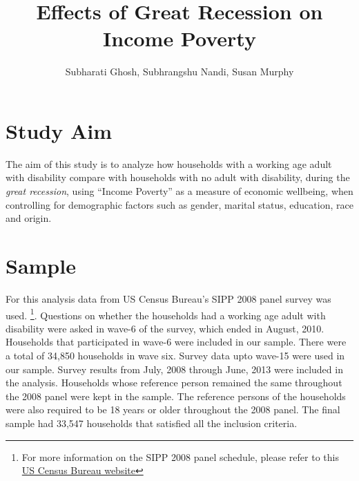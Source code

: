 \documentclass[11pt]{extarticle} %
\begin{document}

\title{Effects of Great Recession on Income Poverty}
\author{Subharati Ghosh, Subhrangshu Nandi, Susan Murphy \\
\date{}
}

\maketitle

\section{Study Aim}
The aim of this study is to analyze how households with a working age adult with disability compare with households with no adult with disability, during the {\emph{great recession}}, using ``Income Poverty'' as a measure of economic wellbeing, when controlling for demographic factors such as gender, marital status, education, race and origin. 

\section{Sample}
For this analysis data from US Census Bureau's SIPP 2008 panel survey was used. {\footnote{For more information on the SIPP 2008 panel schedule, please refer to this \href{http://www.census.gov/programs-surveys/sipp/data/2008-panel.html}{US Census Bureau website}}}. Questions on whether the households had a working age adult with disability were asked in wave-6 of the survey, which ended in August, 2010. Households that participated in wave-6 were included in our sample. There were a total of 34,850 households in wave six. Survey data upto wave-15 were used in our sample. Survey results from July, 2008 through June, 2013 were included in the analysis. Households whose reference person remained the same throughout the 2008 panel were kept in the sample. The reference persons of the households were also required to be 18 years or older throughout the 2008 panel. The final sample had 33,547 households that satisfied all the inclusion criteria. 
\end{document}
